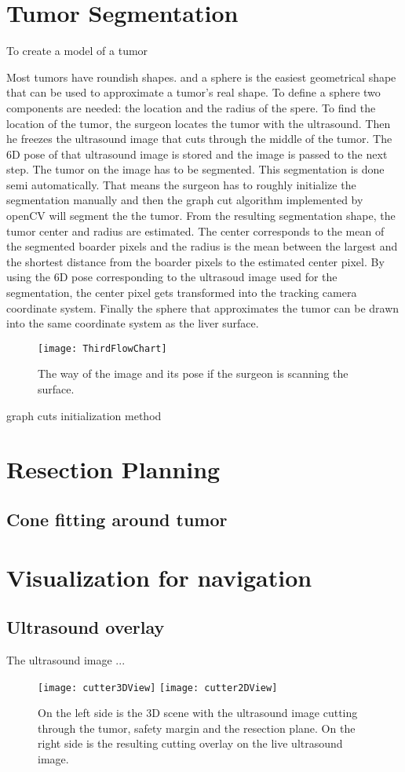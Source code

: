 \section{Tumor Segmentation}
To create a model of a tumor

Most tumors have roundish shapes. and a sphere is the easiest
geometrical shape that can be used to approximate a tumor's real shape. To
define a sphere two components are needed: the location and the radius of the
spere.
To find the location of the tumor, the surgeon locates the tumor with the
ultrasound. Then he freezes the ultrasound image that cuts through the middle of
the tumor. The 6D pose of that ultrasound image is stored and the image is
passed to the next step. The tumor on the image has to be segmented. This
segmentation is done semi automatically. That means the surgeon has to
roughly initialize the segmentation manually and then the graph cut algorithm
implemented by openCV will segment the the tumor. From the resulting
segmentation shape, the tumor center and radius are estimated. The center
corresponds to the mean of the segmented boarder pixels and the radius is the
mean between the largest and the shortest distance from the boarder pixels to
the estimated center pixel. By using the 6D pose corresponding to the ultrasoud
image used for the segmentation, the center pixel gets transformed into the
tracking camera coordinate system. Finally the sphere that approximates the
tumor can be drawn into the same coordinate system as the liver surface.
\begin{figure}[H]
  \centering
 \texttt{[image: ThirdFlowChart]}
  \caption{The way of the image and its pose if the surgeon is scanning the
    surface.}
  \label{fig:ThirdFlowChart}
\end{figure}

graph cuts
initialization method
\section{Resection Planning}
\subsection{Cone fitting around tumor}
\section{Visualization for navigation}
\subsection{Ultrasound overlay}
The ultrasound image ...
\begin{figure}[H]
  \centering
  \texttt{[image: cutter3DView]} 
  \endminipage
  \hfill
  \texttt{[image: cutter2DView]}
  \endminipage
  \hfill 
 \caption{On the left side is the 3D scene with the ultrasound image cutting
   through the tumor, safety margin and the resection plane. On the right side
   is the resulting cutting overlay on the live ultrasound image.}
  \label{fig:cutterExample}
\end{figure}
